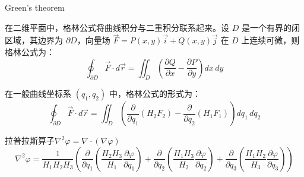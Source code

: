 \documentclass[12pt, a4paper, oneside, UTF8]{ctexbook}  %
\newcommand{\pa}{\partial}
\begin{document}
\begin{lemma}
    Green's theorem

    在二维平面中，格林公式将曲线积分与二重积分联系起来。设 \(D\) 是一个有界的闭区域，其边界为 \(\partial D\)，向量场 \(\vec{F} = P(x, y) \vec{i} + Q(x, y) \vec{j}\) 在 \(D\) 上连续可微，则格林公式为：
    \[
    \oint_{\partial D} \vec{F} \cdot d\vec{r} = \iint_D \left( \frac{\partial Q}{\partial x} - \frac{\partial P}{\partial y} \right) dx \, dy
    \]
    
    在一般曲线坐标系 \((q_1, q_2)\) 中，格林公式的形式为：
    \[
    \oint_{\partial D} \vec{F} \cdot d\vec{r} = \iint_D \left( \frac{\partial}{\partial q_1} (H_2 F_2) - \frac{\partial}{\partial q_2} (H_1 F_1) \right) dq_1 \, dq_2
    \]
\end{lemma}
\begin{defn}
    拉普拉斯算子$\nabla^2\varphi=\nabla\cdot\left(\nabla\varphi\right)$
\[
    \nabla^2\varphi=\frac{1}{H_1 H_2 H_3} \left( \frac{\partial}{\partial q_1} (\frac{H_2 H_3}{H_1} \frac{\pa \varphi}{\pa q_1}) 
    + \frac{\partial}{\partial q_2} (\frac{H_1 H_3}{H_2}\frac{\pa\varphi}{\pa q_2} ) 
    + \frac{\partial}{\partial q_3} (\frac{H_1 H_2}{H_3} \frac{\pa \varphi}{\pa q_3}) \right)
\]
\end{defn}
\end{document}
